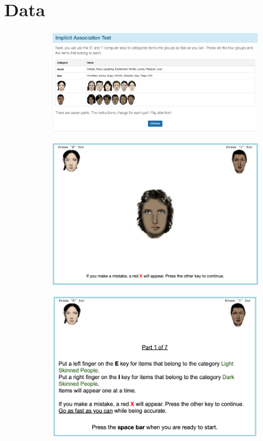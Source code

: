 \documentclass[12pt, fullpage]{article}
\begin{document}
\section{Data} %
\label{sec:data-ap}


\begin{figure}[H]
\centering
\caption{Examples of an Implicit Association Test}
\label{fig:iatexamples}
\begin{subfigure}{.48\textwidth}
\centering
\includegraphics[width=.9\linewidth]{figure/iatexample1.png}
\end{subfigure}
\centering
\begin{subfigure}{.48\textwidth}
\centering
\includegraphics[width=.9\linewidth]{figure/iatexample2.png}
\end{subfigure}
\begin{subfigure}{.48\textwidth}
\centering
\includegraphics[width=.9\linewidth]{figure/iatexample3.png}

\end{subfigure}
\end{figure}
\end{document}
